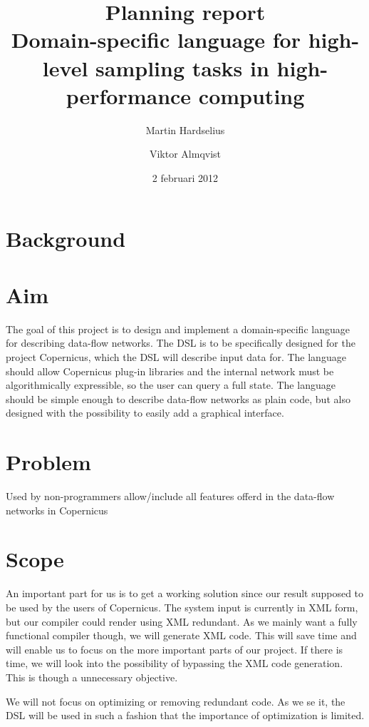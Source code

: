\documentclass[a4paper]{article}
\title{Planning report\\
  \large{Domain-specific language for high-level
  sampling tasks in high-performance computing
  }
}
\author{Martin Hardselius \and Viktor Almqvist}
\date{2 februari 2012}
\begin{document}
\maketitle
\newpage

\section{Background}

\section{Aim}

The goal of this project is to design and implement a domain-specific
language for describing data-flow networks. The DSL is to be
specifically designed for the project Copernicus, which the DSL will
describe input data for. The language should allow Copernicus plug-in
libraries and the internal network must be algorithmically
expressible, so the user can query a full state. The language should
be simple enough to describe data-flow networks as plain code, but
also designed with the possibility to easily add a graphical
interface.


\section{Problem}

Used by non-programmers
allow/include all features offerd in the data-flow networks in Copernicus



\section{Scope}

An important part for us is to get a working solution since our result
supposed to be used by the users of Copernicus. The system input is
currently in XML form, but our compiler could render using XML
redundant. As we mainly want a fully functional compiler though, we
will generate XML code. This will save time and will enable us to
focus on the more important parts of our project. If there is time, we
will look into the possibility of bypassing the XML code
generation. This is though a unnecessary objective.

We will not focus on optimizing or removing redundant code. As we se
it, the DSL will be used in such a fashion that the importance of
optimization is limited.
\end{document}
